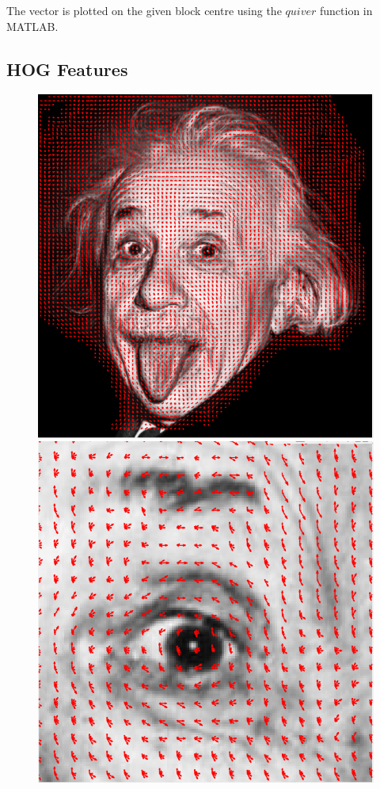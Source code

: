 \documentclass[letter, 11pt]{article}
\begin{document}
The vector is plotted on the given block centre using the $quiver$ function in MATLAB. 
\subsection*{HOG Features}
\begin{figure}[!h]
  \includegraphics[width=\linewidth]{HW1/RESULT/HOG.png}
  \label{fig:HOG IMAGE}
\endminipage\hfill
{}
  \includegraphics[width=\linewidth]{HW1/RESULT/HOG_EYE.png}

\end{figure}
\end{document}
